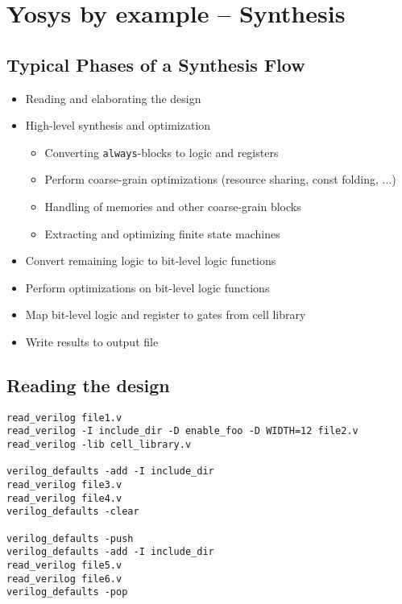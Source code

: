 
\section{Yosys by example -- Synthesis}

\begin{frame}
\sectionpage
\end{frame}


\subsection{Typical Phases of a Synthesis Flow}

\begin{frame}{\subsecname}
\begin{itemize}
\item Reading and elaborating the design
\item High-level synthesis and optimization
\begin{itemize}
\item Converting {\tt always}-blocks to logic and registers
\item Perform coarse-grain optimizations (resource sharing, const folding, ...)
\item Handling of memories and other coarse-grain blocks
\item Extracting and optimizing finite state machines
\end{itemize}
\item Convert remaining logic to bit-level logic functions
\item Perform optimizations on bit-level logic functions
\item Map bit-level logic and register to gates from cell library
\item Write results to output file 
\end{itemize}
\end{frame}


\subsection{Reading the design}

\begin{frame}[fragile]{\subsecname}
\begin{lstlisting}[xleftmargin=0.5cm, basicstyle=\ttfamily\fontsize{8pt}{10pt}\selectfont, language=ys]
read_verilog file1.v
read_verilog -I include_dir -D enable_foo -D WIDTH=12 file2.v
read_verilog -lib cell_library.v

verilog_defaults -add -I include_dir
read_verilog file3.v
read_verilog file4.v
verilog_defaults -clear

verilog_defaults -push
verilog_defaults -add -I include_dir
read_verilog file5.v
read_verilog file6.v
verilog_defaults -pop
\end{lstlisting}
\end{frame}


